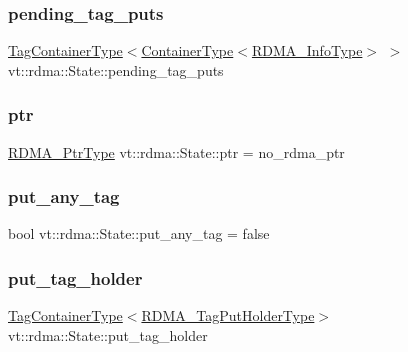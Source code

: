 \subsubsection{\texorpdfstring{pending\+\_\+tag\+\_\+puts}{pending\_tag\_puts}}
{\footnotesize\ttfamily \hyperlink{structvt_1_1rdma_1_1_state_ad84b403803cc575ef54d0d0ac74017e9}{Tag\+Container\+Type}$<$\hyperlink{structvt_1_1rdma_1_1_state_a7506401f1846be85f14e73e75b773a5d}{Container\+Type}$<$\hyperlink{structvt_1_1rdma_1_1_state_a6a78216795efe7fb6966c33b1a21d7cf}{R\+D\+M\+A\+\_\+\+Info\+Type}$>$ $>$ vt\+::rdma\+::\+State\+::pending\+\_\+tag\+\_\+puts\hspace{0.3cm}{\ttfamily [private]}}

\mbox{\label{structvt_1_1rdma_1_1_state_a60bb2c1f277de56d89e741f87e944c93}} 
\subsubsection{\texorpdfstring{ptr}{ptr}}
{\footnotesize\ttfamily \hyperlink{namespacevt_aab05b4a584f7ee835a6d0f66915cf59b}{R\+D\+M\+A\+\_\+\+Ptr\+Type} vt\+::rdma\+::\+State\+::ptr = no\+\_\+rdma\+\_\+ptr}

\mbox{\label{structvt_1_1rdma_1_1_state_a934ef23284043246b24c3f746919bc79}} 
\subsubsection{\texorpdfstring{put\+\_\+any\+\_\+tag}{put\_any\_tag}}
{\footnotesize\ttfamily bool vt\+::rdma\+::\+State\+::put\+\_\+any\+\_\+tag = false\hspace{0.3cm}{\ttfamily [private]}}

\mbox{\label{structvt_1_1rdma_1_1_state_aed4540b539aa2d8e86f83f235c0722ad}} 
\subsubsection{\texorpdfstring{put\+\_\+tag\+\_\+holder}{put\_tag\_holder}}
{\footnotesize\ttfamily \hyperlink{structvt_1_1rdma_1_1_state_ad84b403803cc575ef54d0d0ac74017e9}{Tag\+Container\+Type}$<$\hyperlink{structvt_1_1rdma_1_1_state_a8a25176f05bb2570889d6b41089ac1ca}{R\+D\+M\+A\+\_\+\+Tag\+Put\+Holder\+Type}$>$ vt\+::rdma\+::\+State\+::put\+\_\+tag\+\_\+holder\hspace{0.3cm}{\ttfamily [private]}}

